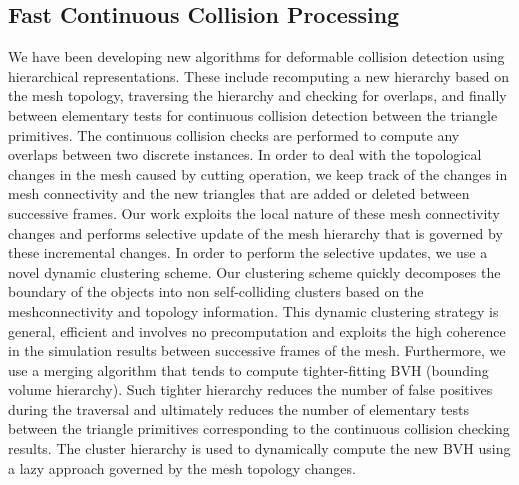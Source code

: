 \subsection{Fast Continuous Collision Processing}\label{ssec:fast_ccd}
We have been developing new algorithms for deformable collision detection using hierarchical representations. These include recomputing a new hierarchy based on the mesh topology, traversing the hierarchy and checking for overlaps, and finally between elementary tests for continuous collision detection between the triangle primitives. The continuous collision checks are performed to compute any overlaps between two discrete instances. In order to deal with the topological changes in the mesh caused by cutting operation, we keep track of the changes in mesh connectivity and the new triangles that are added or deleted between successive frames. Our work exploits the local nature of these mesh connectivity changes and performs selective update of the mesh hierarchy that is governed by these incremental changes. In order to perform the selective updates, we use a novel dynamic clustering scheme. Our clustering scheme quickly decomposes the boundary of the objects into non self-colliding clusters based on the meshconnectivity and topology information. This dynamic clustering strategy is general, efficient and involves no precomputation and exploits the high coherence in the simulation results between successive frames of the mesh. Furthermore, we use a merging algorithm that tends to compute tighter-fitting BVH (bounding volume hierarchy). Such tighter hierarchy reduces the number of false positives during the traversal and ultimately reduces the number of elementary tests between the triangle primitives corresponding to the continuous collision checking results. The cluster hierarchy is used to dynamically compute the new BVH using a lazy approach governed by the mesh topology changes.

